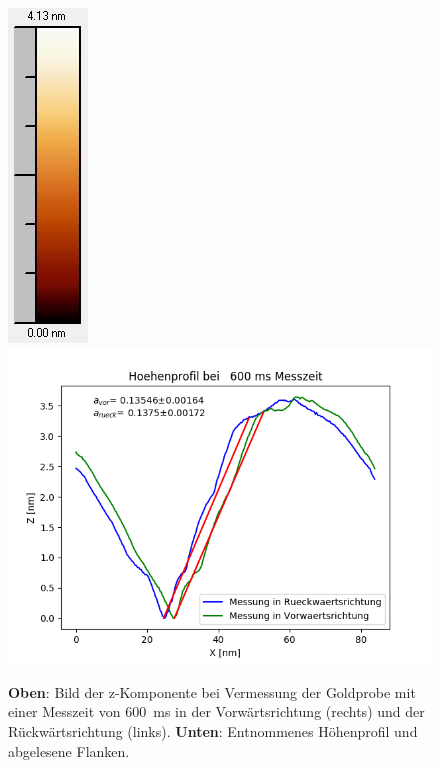 \documentclass[12pt,a4paper]{article}
\begin{document}
\begin{figure}
\includegraphics[scale=0.6]{Bilder/Anhang/Zeit/0_6_Zeit_nach_Skala.jpg}
\includegraphics[scale=0.6]{Bilder/Anhang/Zeit/Profil_Zeit_600.png}
\caption{\textbf{Oben}: Bild der z-Komponente bei Vermessung der Goldprobe mit einer Messzeit von \SI{600}{ms} in der Vorwärtsrichtung (rechts) und der Rückwärtsrichtung (links). \textbf{Unten}: Entnommenes Höhenprofil und abgelesene Flanken.}
\end{figure}
\end{document}
